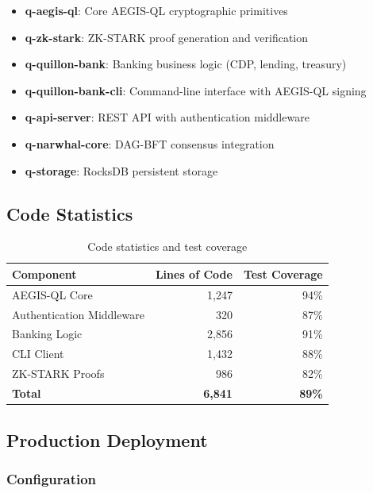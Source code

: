 \documentclass[11pt,a4paper]{article}
\begin{document}
\begin{itemize}[leftmargin=*]
    \item \textbf{q-aegis-ql}: Core AEGIS-QL cryptographic primitives
    \item \textbf{q-zk-stark}: ZK-STARK proof generation and verification
    \item \textbf{q-quillon-bank}: Banking business logic (CDP, lending, treasury)
    \item \textbf{q-quillon-bank-cli}: Command-line interface with AEGIS-QL signing
    \item \textbf{q-api-server}: REST API with authentication middleware
    \item \textbf{q-narwhal-core}: DAG-BFT consensus integration
    \item \textbf{q-storage}: RocksDB persistent storage
\end{itemize}

\subsection{Code Statistics}

\begin{table}[h]
\centering
\begin{tabular}{@{}lrr@{}}
\toprule
\textbf{Component} & \textbf{Lines of Code} & \textbf{Test Coverage} \\ \midrule
AEGIS-QL Core & 1,247 & 94\% \\
Authentication Middleware & 320 & 87\% \\
Banking Logic & 2,856 & 91\% \\
CLI Client & 1,432 & 88\% \\
ZK-STARK Proofs & 986 & 82\% \\ \midrule
\textbf{Total} & \textbf{6,841} & \textbf{89\%} \\ \bottomrule
\end{tabular}
\caption{Code statistics and test coverage}
\label{tab:code_stats}
\end{table}

\subsection{Production Deployment}

\subsubsection{Configuration}
\end{document}
